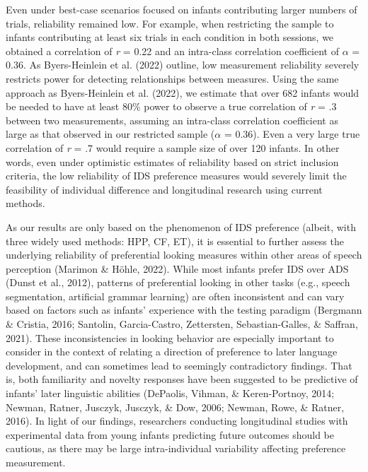 \documentclass[
  man,floatsintext]{apa6}
\begin{document}
Even under best-case scenarios focused on infants contributing larger numbers of trials, reliability remained low.
For example, when restricting the sample to infants contributing at least six trials in each condition in both sessions, we obtained a correlation of \emph{r} = 0.22 and an intra-class correlation coefficient of \(\alpha\) = 0.36.
As Byers-Heinlein et al. (2022) outline, low measurement reliability severely restricts power for detecting relationships between measures.
Using the same approach as Byers-Heinlein et al. (2022), we estimate that over 682 infants would be needed to have at least 80\% power to observe a true correlation of \emph{r} = .3 between two measurements, assuming an intra-class correlation coefficient as large as that observed in our restricted sample (\(\alpha\) = 0.36).
Even a very large true correlation of \emph{r} = .7 would require a sample size of over 120 infants.
In other words, even under optimistic estimates of reliability based on strict inclusion criteria, the low reliability of IDS preference measures would severely limit the feasibility of individual difference and longitudinal research using current methods.

As our results are only based on the phenomenon of IDS preference (albeit, with three widely used methods: HPP, CF, ET), it is essential to further assess the underlying reliability of preferential looking measures within other areas of speech perception (Marimon \& Höhle, 2022).
While most infants prefer IDS over ADS (Dunst et al., 2012), patterns of preferential looking in other tasks (e.g., speech segmentation, artificial grammar learning) are often inconsistent and can vary based on factors such as infants' experience with the testing paradigm (Bergmann \& Cristia, 2016; Santolin, Garcia-Castro, Zettersten, Sebastian-Galles, \& Saffran, 2021).
These inconsistencies in looking behavior are especially important to consider in the context of relating a direction of preference to later language development, and can sometimes lead to seemingly contradictory findings.
That is, both familiarity and novelty responses have been suggested to be predictive of infants' later linguistic abilities (DePaolis, Vihman, \& Keren-Portnoy, 2014; Newman, Ratner, Jusczyk, Jusczyk, \& Dow, 2006; Newman, Rowe, \& Ratner, 2016).
In light of our findings, researchers conducting longitudinal studies with experimental data from young infants predicting future outcomes should be cautious, as there may be large intra-individual variability affecting preference measurement.
\end{document}

